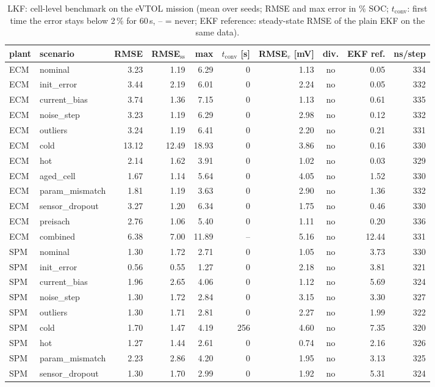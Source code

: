 \begin{table}[H]\centering\footnotesize\setlength{\tabcolsep}{4pt}
\caption{LKF: cell-level benchmark on the eVTOL mission (mean over seeds; RMSE and max error in \% SOC; $t_\mathrm{conv}$: first time the error stays below 2\,\% for 60\,s, -- = never; EKF reference: steady-state RMSE of the plain EKF on the same data).}\label{tab:cell_LKF}
\begin{tabular}{llrrrrrcrr}\toprule
plant & scenario & RMSE & RMSE$_\mathrm{ss}$ & max & $t_\mathrm{conv}$ [s] & RMSE$_v$ [mV] & div. & EKF ref. & ns/step \\ \midrule
ECM & nominal & 3.23 & 1.19 & 6.29 & 0 & 1.13 & no & 0.05 & 334 \\
ECM & init\_error & 3.44 & 2.19 & 6.01 & 0 & 2.24 & no & 0.05 & 332 \\
ECM & current\_bias & 3.74 & 1.36 & 7.15 & 0 & 1.13 & no & 0.61 & 335 \\
ECM & noise\_step & 3.23 & 1.19 & 6.29 & 0 & 2.98 & no & 0.12 & 332 \\
ECM & outliers & 3.24 & 1.19 & 6.41 & 0 & 2.20 & no & 0.21 & 331 \\
ECM & cold & 13.12 & 12.49 & 18.93 & 0 & 3.86 & no & 0.16 & 330 \\
ECM & hot & 2.14 & 1.62 & 3.91 & 0 & 1.02 & no & 0.03 & 329 \\
ECM & aged\_cell & 1.67 & 1.14 & 5.64 & 0 & 4.05 & no & 1.52 & 330 \\
ECM & param\_mismatch & 1.81 & 1.19 & 3.63 & 0 & 2.90 & no & 1.36 & 332 \\
ECM & sensor\_dropout & 3.27 & 1.20 & 6.34 & 0 & 1.75 & no & 0.46 & 330 \\
ECM & preisach & 2.76 & 1.06 & 5.40 & 0 & 1.11 & no & 0.20 & 336 \\
ECM & combined & 6.38 & 7.00 & 11.89 & -- & 5.16 & no & 12.44 & 331 \\
\midrule
SPM & nominal & 1.30 & 1.72 & 2.71 & 0 & 1.05 & no & 3.73 & 330 \\
SPM & init\_error & 0.56 & 0.55 & 1.27 & 0 & 2.18 & no & 3.81 & 321 \\
SPM & current\_bias & 1.96 & 2.65 & 4.06 & 0 & 1.12 & no & 5.69 & 324 \\
SPM & noise\_step & 1.30 & 1.72 & 2.84 & 0 & 3.15 & no & 3.30 & 327 \\
SPM & outliers & 1.30 & 1.71 & 2.81 & 0 & 2.27 & no & 1.99 & 322 \\
SPM & cold & 1.70 & 1.47 & 4.19 & 256 & 4.60 & no & 7.35 & 320 \\
SPM & hot & 1.27 & 1.44 & 2.61 & 0 & 0.74 & no & 2.16 & 326 \\
SPM & param\_mismatch & 2.23 & 2.86 & 4.20 & 0 & 1.95 & no & 3.13 & 325 \\
SPM & sensor\_dropout & 1.30 & 1.70 & 2.99 & 0 & 1.92 & no & 5.31 & 324 \\
\bottomrule\end{tabular}\end{table}
